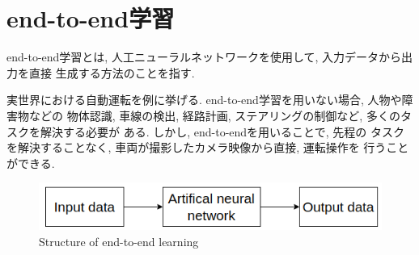 
\section{end-to-end学習}
end-to-end学習とは, 人工ニューラルネットワークを使用して, 入力データから出力を直接
生成する方法のことを指す. \par
実世界における自動運転を例に挙げる. end-to-end学習を用いない場合, 人物や障害物などの
物体認識, 車線の検出, 経路計画, ステアリングの制御など, 多くのタスクを解決する必要が
ある. しかし, end-to-endを用いることで, 先程の
タスクを解決することなく, 車両が撮影したカメラ映像から直接, 運転操作を
行うことができる. 
\vspace{5cm}

\begin{figure}[hbtp]
  \centering
 \includegraphics[keepaspectratio, scale=0.7]
      {images/end-to-end.png}
 \caption{Structure of end-to-end learning}
 \label{Fig:end-to-end}
\end{figure}

\newpage
